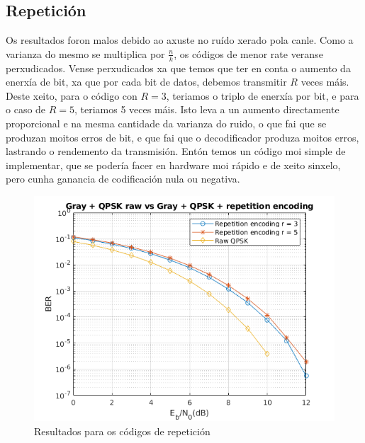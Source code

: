 \documentclass[
	10pt, %
	spanish, %
]{fphw}
\begin{document}
\subsection*{Repetición}
Os resultados foron malos debido ao axuste no ruído xerado pola canle. Como a varianza do mesmo se multiplica por $\frac{n}{k}$, os códigos de menor rate veranse perxudicados. Vense perxudicados xa que temos que ter en conta o aumento da enerxía de bit, xa que por cada bit de datos, debemos transmitir $R$ veces máis. Deste xeito, para o código con $R = 3$, teriamos o triplo de enerxía por bit, e para o caso de $R = 5$, teriamos 5 veces máis.
Isto leva a un aumento directamente proporcional e na mesma cantidade da varianza do ruido, o que fai que se produzan moitos erros de bit, e que fai que o decodificador produza moitos erros, lastrando o rendemento da transmisión.
Entón temos un código moi simple de implementar, que se podería facer en hardware moi rápido e de xeito sinxelo, pero cunha ganancia de codificación nula ou negativa.
\begin{figure}[htb]
\centering
\includegraphics{repetition.png}
\caption{Resultados para os códigos de repetición}
\end{figure}
\end{document}
